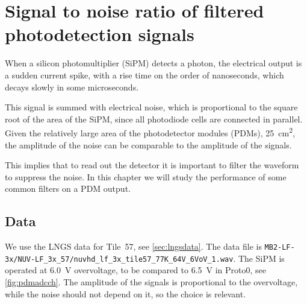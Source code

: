 \chapter{Signal to noise ratio of filtered photodetection signals}
\label{ch:snr}

When a silicon photomultiplier (SiPM) detects a photon, the electrical output
is a sudden current spike, with a rise time on the order of nanoseconds, which
decays slowly in some microseconds.

This signal is summed with electrical noise, which is proportional to the
square root of the area of the SiPM, since all photodiode cells are connected
in parallel. Given the relatively large area of the photodetector modules
(PDMs), \SI{25}{cm^2}, the amplitude of the noise can be comparable to the
amplitude of the signals.

This implies that to read out the detector it is important to filter the
waveform to suppress the noise. In this chapter we will study the performance
of some common filters on a PDM output.

\section{Data}
\label{sec:snrdata}

\begin{figure}[p]
    
    
    
    
\end{figure}

\begin{figure}[p]
    


\end{figure}

We use the LNGS data for Tile~57, see \autoref{sec:lngsdata}. The data file is
\nolinkurl{MB2-LF-3x/NUV-LF_3x_57/nuvhd_lf_3x_tile57_77K_64V_6VoV_1.wav}. The
SiPM is operated at \SI{6.0}{V} overvoltage, to be compared to \SI{6.5}{V} in
Proto0, see \autoref{fig:pdmadcch}. The amplitude of the signals is
proportional to the overvoltage, while the noise should not depend on it, so
the choice is relevant.


